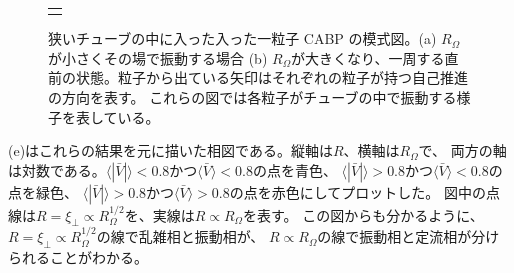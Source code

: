 \documentclass[/Users/ikedahajime/GitHub/reserch/master_report/thesis]{subfiles}
\begin{document}
\begin{figure}
\begin{tabular}{c}
\begin{minipage}{0.4\hsize}
        \end{minipage}
    \end{tabular}
    \caption[Four sample images]
    {
        狭いチューブの中に入った入った一粒子 CABP の模式図。(a) $R_{\Omega}$が小さくその場で振動する場合
        (b) $R_\Omega$が大きくなり、一周する直前の状態。粒子から出ている矢印はそれぞれの粒子が持つ自己推進の方向を表す。
        これらの図では各粒子がチューブの中で振動する様子を表している。
    }
    \label{fig:image_cabp_in_tube}
\end{figure}

(e)はこれらの結果を元に描いた相図である。縦軸は$R$、横軸は$R_\Omega$で、
両方の軸は対数である。$\langle |\bar{V}| \rangle<0.8$かつ$\langle \bar{V} \rangle<0.8$の点を青色、
$\langle |\bar{V}| \rangle>0.8$かつ$\langle \bar{V} \rangle<0.8$の点を緑色、
$\langle |\bar{V}| \rangle>0.8$かつ$\langle \bar{V} \rangle>0.8$の点を赤色にしてプロットした。
図中の点線は$R=\xi_\bot\propto R_\Omega^{1/2}$を、実線は$R\propto R_\Omega$を表す。
この図からも分かるように、$R=\xi_\bot\propto R_\Omega^{1/2}$の線で乱雑相と振動相が、
$R\propto R_\Omega$の線で振動相と定流相が分けられることがわかる。
\end{document}
